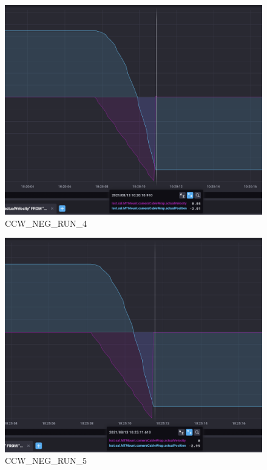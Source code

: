 \documentclass[SE,authoryear,toc, lsstdraft]{lsstdoc}
\begin{document}
\begin{figure}
  \includegraphics[width=\linewidth]{media/ccw_neg_4.png}
  \caption{CCW\_NEG\_RUN\_4}
  \label{fig:CCW_NEG_RUN_4}
\end{figure}

\begin{figure}
  \includegraphics[width=\linewidth]{media/ccw_neg_5.png}
  \caption{CCW\_NEG\_RUN\_5}
  \label{fig:CCW_NEG_RUN_5}
\end{figure}
\newpage
\end{document}
